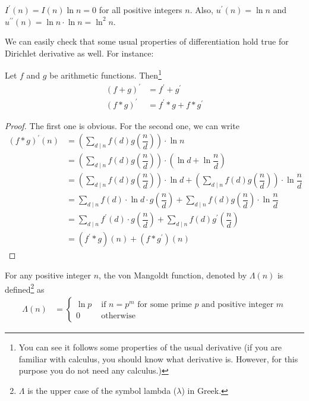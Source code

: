\documentclass{subfile}
\begin{document}
	\begin{example}
		$I^\prime(n)=I(n)\ln n=0$ for all positive integers $n$. Also, $u^\prime(n)=\ln n$ and $u^{\prime\prime}(n)=\ln n\cdot\ln n=\ln^2 n$.
	\end{example}
We can easily check that some usual properties of differentiation hold true for Dirichlet derivative as well. For instance:
	\begin{proposition}
		Let $f$ and $g$ be arithmetic functions. Then\footnote{You can see it follows some properties of the usual derivative (if you are familiar with calculus, you should know what derivative is. However, for this purpose you do not need any calculus.)}
			\begin{align*}
				(f+g)^\prime & =f^\prime+g^\prime\\
				(f\ast g)^\prime& =f^\prime \ast g + f\ast g^\prime
			\end{align*}
	\end{proposition}
	\begin{proof}
		The first one is obvious. For the second one, we can write
			\begin{align*}
				(f\ast g)^\prime (n)
					&= \left(\sum_{d\mid n} f(d)g\left(\dfrac{n}{d}\right)\right) \cdot \ln n\\
					&= \left(\sum_{d\mid n} f(d)g\left(\dfrac{n}{d}\right)\right) \cdot \left(\ln d + \ln \dfrac{n}{d}\right)\\
					&= \left(\sum_{d\mid n} f(d)g\left(\dfrac{n}{d}\right)\right) \cdot \ln d + \left(\sum_{d\mid n} f(d)g\left(\dfrac{n}{d}\right)\right) \cdot \ln \dfrac{n}{d}\\
					&= \sum_{d\mid n} f(d)\cdot \ln d \cdot g\left(\dfrac{n}{d}\right)+ \sum_{d\mid n} f(d) g\left(\dfrac{n}{d}\right) \cdot \ln \dfrac{n}{d}\\
					&= \sum_{d\mid n} f^\prime(d) \cdot g\left(\dfrac{n}{d}\right)+ \sum_{d\mid n} f(d) g^\prime\left(\dfrac{n}{d}\right)\\
					&= (f^\prime \ast g)(n) + (f\ast g^\prime)(n)
			\end{align*}

	\end{proof}
	\begin{definition}
		For any positive integer $n$, the von Mangoldt function, denoted by $\Lambda(n)$ is defined\footnote{$\Lambda$ is the upper case of the symbol lambda ($\lambda$) in Greek.} as
			\begin{align*}
				\Lambda(n) & =
					\begin{cases}\ln p &\mbox{ if }n=p^m\mbox{ for  some prime }p\mbox{ and positive integer }m\\0&\mbox{ otherwise}\end{cases}
			\end{align*}
	\end{definition}
\end{document}
